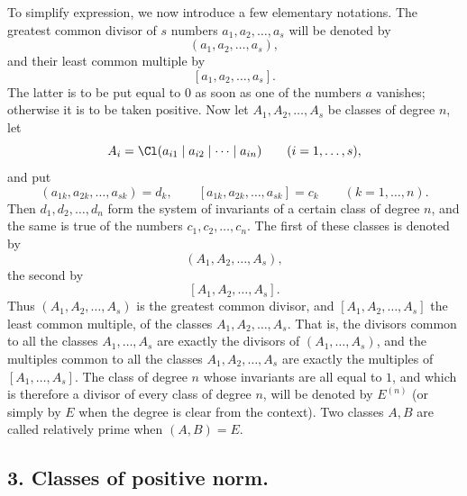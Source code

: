 To simplify expression, we now introduce a few elementary notations. The greatest common divisor of $s$ numbers $a_1,a_2,\ldots,a_s$ will be denoted by
\[
 (a_1,a_2,\ldots,a_s),
\]
and their least common multiple by
\[
 [a_1,a_2,\ldots,a_s].
\]
The latter is to be put equal to $0$ as soon as one of the numbers $a$ vanishes; otherwise it is to be taken positive. Now let $A_1,A_2,\ldots,A_s$ be classes of degree $n$, let
\[
 A_i=\Cl(a_{i1}\mid a_{i2}\mid\cdots\mid a_{in})\qquad (i=1,\ldots,s),
\]
and put
\[
 (a_{1k},a_{2k},\ldots,a_{sk})=d_k,
 \qquad [a_{1k},a_{2k},\ldots,a_{sk}]=c_k\qquad(k=1,\ldots,n).
\]
Then $d_1,d_2,\ldots,d_n$ form the system of invariants of a certain class of degree $n$, and the same is true of the numbers $c_1,c_2,\ldots,c_n$. The first of these classes is denoted by
\[
 (A_1,A_2,\ldots,A_s),
\]
the second by
\[
 [A_1,A_2,\ldots,A_s].
\]
Thus $(A_1,A_2,\ldots,A_s)$ is the greatest common divisor, and $[A_1,A_2,\ldots,A_s]$ the least common multiple, of the classes $A_1,A_2,\ldots,A_s$. That is, the divisors common to all the classes $A_1,\ldots,A_s$ are exactly the divisors of $(A_1,\ldots,A_s)$, and the multiples common to all the classes $A_1,A_2,\ldots,A_s$ are exactly the multiples of $[A_1,\ldots,A_s]$. The class of degree $n$ whose invariants are all equal to $1$, and which is therefore a divisor of every class of degree $n$, will be denoted by $E^{(n)}$ (or simply by $E$ when the degree is clear from the context). Two classes $A,B$ are called relatively prime when $(A,B)=E$.

\subsection*{3. Classes of positive norm.}

